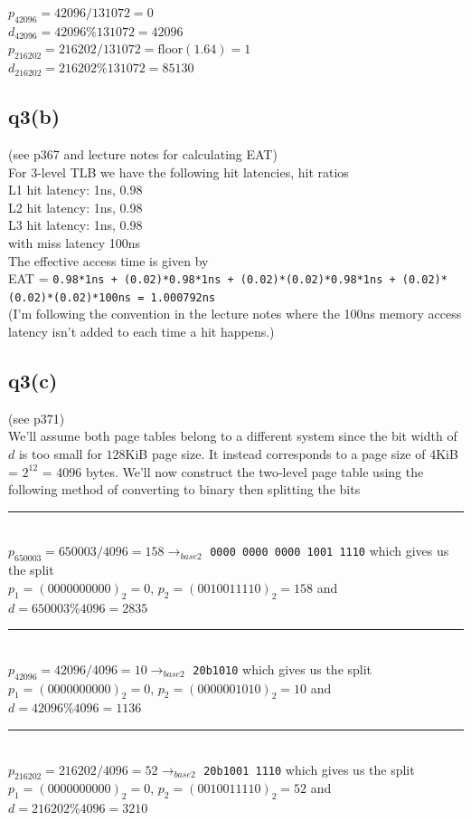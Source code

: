 \documentclass{assignment}
\def\code#1{\texttt{#1}}
\begin{document}
$p_{42096} = 42096 / 131072 = 0$ \\
$d_{42096} =  42096 \% 131072 =  42096$ \\

$p_{216202} = 216202 / 131072 = \text{floor}(1.64) = 1$ \\
$d_{216202} =  216202 \% 131072 =  85130$ 
\subsection*{q3(b)}
(see p367 and lecture notes for calculating EAT) \\
For 3-level TLB we have the following hit latencies, hit ratios \\
L1 hit latency: 1ns, 0.98 \\
L2 hit latency: 1ns, 0.98 \\
L3 hit latency: 1ns, 0.98 \\
with miss latency 100ns \\
The effective access time is given by \\ EAT = \code{0.98*1ns + (0.02)*0.98*1ns + (0.02)*(0.02)*0.98*1ns + (0.02)*(0.02)*(0.02)*100ns = 1.000792ns} \\
(I'm following the convention in the lecture notes where the 100ns memory access latency isn't added to each time a hit happens.)
\subsection*{q3(c)}
(see p371) \\
We'll assume both page tables belong to a different system since the bit width of $d$ is too small for $128$KiB page size. It instead corresponds
to a page size of 4KiB = $2^{12}$ = 4096 bytes. 
We'll now construct the two-level page table using the following method of converting to binary then splitting the bits\\
\noindent\rule{10cm}{1pt} \\
$p_{650003} = 650003 / 4096 = 158 \rightarrow_{base 2}$ \code{0000 0000 0000 1001 1110} which gives us the split \\
$p_1 = (0000000000)_2 = 0$, $p_2 = (0010011110)_2 = 158$ and $d = 650003 \% 4096 = 2835$ \\
\noindent\rule{10cm}{1pt} \\
$p_{42096} = 42096 / 4096 = 10 \rightarrow_{base 2}$ \code{20b1010} which gives us the split \\
$p_1 = (0000000000)_2 = 0$, $p_2 = (0000001010)_2 = 10$ and $d = 42096 \% 4096 = 1136$ \\
\noindent\rule{10cm}{1pt} \\
$p_{216202} = 216202 / 4096 = 52 \rightarrow_{base 2}$ \code{20b1001 1110} which gives us the split \\
$p_1 = (0000000000)_2 = 0$, $p_2 = (0010011110)_2 = 52$ and $d = 216202 \% 4096 = 3210$
\end{document}
